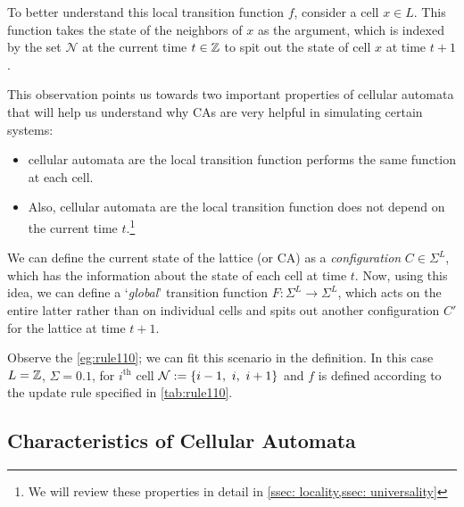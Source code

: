 \documentclass[11pt, oneside, listof=totoc]{scrbook}
\begin{document}
To better understand this local transition function \(f\), consider a cell \(x \in L\). This function takes the state of the neighbors of \(x\) as the argument, which is indexed by the set \(\mathcal{N}\) at the current time \(t \in \mathbb Z\) to spit out the state of cell $x$ at time $t + 1$.

\noindent This observation points us towards two important properties of cellular automata that will help us understand why CAs are very helpful in simulating certain systems:

\begin{itemize}
    \item cellular automata are  \ie the local transition function performs the same function at each cell.
    \item Also, cellular automata are  \ie the local transition function does not depend on the current time $t$.\footnote{We will review these properties in detail in \cref{ssec: locality,ssec: universality}}
\end{itemize}

\noindent We can define the current state of the lattice (or CA) as a \emph{configuration} \(C \in \Sigma^{L}\), which has the information about the state of each cell at time \(t\). Now, using this idea, we can define a `\emph{global}' transition function \(F: \Sigma^{L} \to \Sigma^{L}\), which acts on the entire latter rather than on individual cells and spits out another configuration \(C'\) for the lattice at time \(t+1\).

\begin{remark}
    Observe the \cref{eg:rule110}; we can fit this scenario in the definition. In this case \(L = \mathbb Z\), \(\Sigma = \qty{0, 1}\), for $i^{\text{th}}$ cell \(\mathcal{N} := \qty{i-1,~ i,~ i+1}\) and \(f\) is defined according to the update rule specified in \cref{tab:rule110}.
\end{remark}

\subsection{Characteristics of Cellular Automata}
\end{document}
